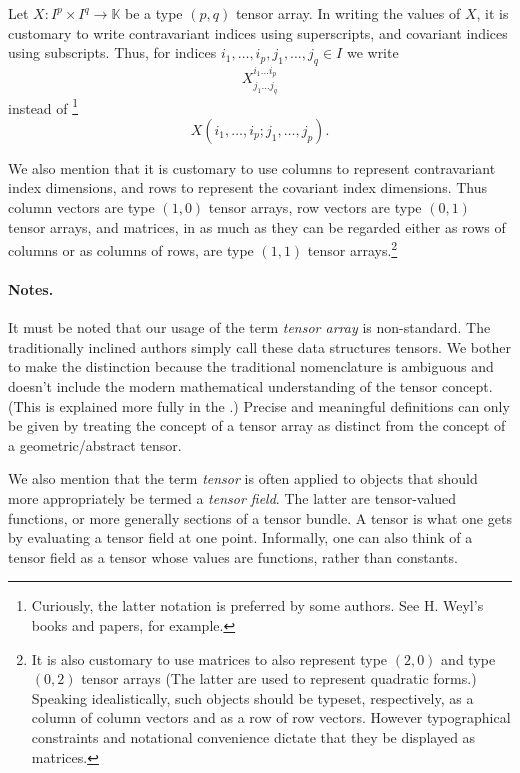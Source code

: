\documentclass[12pt]{article}
\newcommand{\kfield}{\mathbb{K}}
\begin{document}
Let 
$X:I^p\times I^q\rightarrow \kfield$
be a type $(p,q)$ tensor array.
In writing the values of $X$, it is customary to write contravariant
indices using superscripts, and covariant indices using subscripts.
Thus, for indices $i_1,\ldots, i_p, j_1,\ldots,j_q\in I$ we write 
$$X^{i_1\ldots
  i_p}_{j_1\ldots j_q}$$ instead of \footnote{Curiously, the latter notation is preferred by some
  authors.  See H. Weyl's books and papers, for example.}
$$X(i_1,\ldots,i_p;j_1,\ldots,
j_p).$$

We also mention that it is customary to use columns to represent
contravariant index dimensions, and rows to represent the covariant
index dimensions.  Thus column vectors are type $(1,0)$ tensor arrays,
row vectors are type $(0,1)$ tensor arrays, and matrices, in as much
as they can be regarded either as rows of columns or as columns of
rows, are type $(1,1)$ tensor arrays.\footnote{It is also customary to
  use matrices to also represent type $(2,0)$ and type $(0,2)$ tensor
  arrays (The latter are used to represent quadratic forms.)
  Speaking idealistically, such objects should be typeset,
  respectively, as a column of column vectors and as a row of row
  vectors. However typographical constraints and notational
  convenience dictate that they be displayed as matrices.}

\paragraph{Notes.}
It must be noted that our usage of the term {\em tensor array} is
non-standard.  The traditionally inclined authors simply call these
data structures tensors.  We bother to make the distinction because
the traditional nomenclature is ambiguous and doesn't include the
modern mathematical understanding of the tensor concept. (This is
explained more fully in the .)  Precise and
meaningful definitions can only be given by treating the concept of a
tensor array as distinct from the concept of a geometric/abstract
tensor.


We also mention that the term {\em tensor} is often applied to objects
that should more appropriately be termed a {\em tensor field}.  The
latter are tensor-valued functions, or more generally sections of a
tensor bundle.  A tensor is what one gets by evaluating a tensor field
at one point.  Informally, one can also think of a tensor field as a
tensor whose values are functions, rather than constants.
\end{document}
